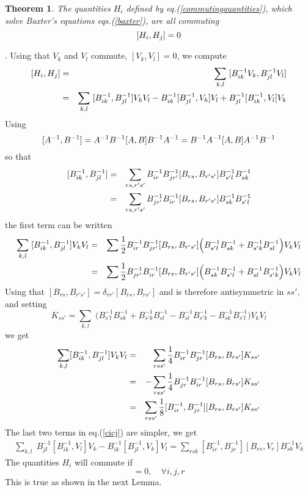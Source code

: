 \documentclass[a4paper,11pt]{article}
\newtheorem{theorem}{Theorem}
\def\proof{\noindent  {\underline {Proof}}. }
\def\square{ {\hfill \vrule height6pt width6pt depth1pt} \bigskip \medskip }
\begin{document}
\begin{theorem}
The quantities $H_i$ defined by eq.(\ref{commutingquantities}), which
solve Baxter's equations eqs.(\ref{baxter}),
are all commuting
$$
\relax [ H_i , H_j ] = 0
$$
\end{theorem}
\proof
Using that $V_k$ and $V_l$ commute, $[ V_k,V_l ] = 0$, we compute 
\begin{eqnarray}
\relax [ H_i, H_j ] &=& \sum_{k,l}\; [ B^{-1}_{ik} V_k , B^{-1}_{jl} V_l ] \label{cicj} \\
&=&\sum_{k,l}\;  [B^{-1}_{ik}, B^{-1}_{jl} ] V_k V_l 
- B^{-1}_{ik} [B^{-1}_{jl}, V_k ] V_l 
+ B^{-1}_{jl} [B^{-1}_{ik}, V_l ] V_k \nonumber
\end{eqnarray}
Using 
$$
\relax [A^{-1}, B^{-1} ] =A^{-1} B^{-1}[A,B]B^{-1}A^{-1}= 
B^{-1} A^{-1}[A,B]A^{-1}B^{-1}
$$
so that
\begin{eqnarray*}
\relax [ B_{ik}^{-1}, B_{jl}^{-1} ] &=&  \sum_{rs,r's'}B^{-1}_{ir}B^{-1}_{jr'}
[B_{rs}, B_{r's'}] B^{-1}_{s'l}B^{-1}_{sk} \\
&=&  \sum_{rs,r's'}B^{-1}_{jr'} B^{-1}_{ir}
[B_{rs}, B_{r's'}]B^{-1}_{sk} B^{-1}_{s'l}
\end{eqnarray*}
the first term can be written
\begin{eqnarray*}
\sum_{k,l}\; [B^{-1}_{ik}, B^{-1}_{jl} ]  V_kV_l &=&
\sum {1\over 2} B^{-1}_{ir}B^{-1}_{jr'}  [B_{rs}, B_{r's'}]
 \Big( B^{-1}_{s'l} B^{-1}_{sk} + B^{-1}_{s'k}  B^{-1}_{sl} \Big) V_kV_l \\
&=&\sum {1\over 2}B^{-1}_{jr'} B^{-1}_{ir}  [B_{rs}, B_{r's'}]
 \Big(  B^{-1}_{sk}B^{-1}_{s'l} +  B^{-1}_{sl} B^{-1}_{s'k} \Big) V_kV_l \\
\end{eqnarray*}
Using that $[B_{rs}, B_{r's'}] = \delta_{rr'}[B_{rs}, B_{rs'}]$ and is therefore
antisymmetric in $ss'$, and setting
$$
K_{ss'} = \sum_{k,l}\; \Big( 
B^{-1}_{s'l} B^{-1}_{sk} + B^{-1}_{s'k}  B^{-1}_{sl} 
-B^{-1}_{sl} B^{-1}_{s'k} - B^{-1}_{sk}  B^{-1}_{s'l} 
\Big) V_kV_l
$$
 we get
\begin{eqnarray*}
\sum_{k,l} [B^{-1}_{ik}, B^{-1}_{jl} ]  V_kV_l &=&
\sum_{rss'} {1\over 4} B^{-1}_{ir}B^{-1}_{jr}  [B_{rs}, B_{rs'}] K_{ss'} \\
&=&-\sum_{rss'} {1\over 4}B^{-1}_{jr} B^{-1}_{ir}  [B_{rs}, B_{rs'}]K_{ss'} \\
&=&\sum_{rss'} {1\over 8}[B^{-1}_{ir}, B^{-1}_{jr}]  [B_{rs}, B_{rs'}]K_{ss'} 
 \end{eqnarray*}
The last two terms in eq.(\ref{cicj}) are simpler, we get
\begin{eqnarray*}
\sum_{k,l}\;  B^{-1}_{jl} [B^{-1}_{ik}, V_l ] V_k
 - B^{-1}_{ik} [B^{-1}_{jl}, V_k ] V_l =
\sum_{rsk} [B^{-1}_{ir}, B^{-1}_{jr}]  [B_{rs}, V_{r}] B_{sk}^{-1} V_k
\end{eqnarray*}
The quantities $H_i$ will commute if
\begin{equation}
 [B^{-1}_{ir}, B^{-1}_{jr}] = 0, \quad \forall i,j,r
\label{comb-1}
\end{equation}
This is true as shown in the next Lemma. \square
\end{document}
